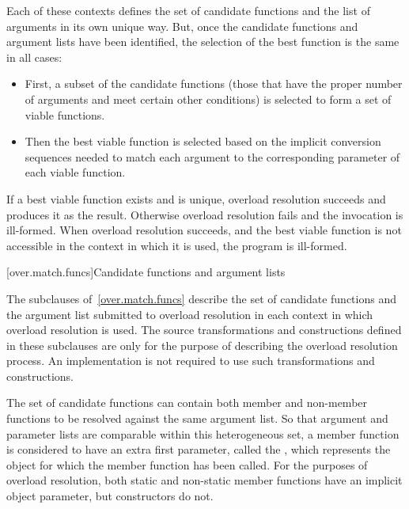 Each of these contexts defines the set of candidate functions and
the list of arguments in its own unique way.
But, once the
candidate functions and argument lists have been identified, the
selection of the best function is the same in all cases:

\begin{itemize}
\item
First, a subset of the candidate functions (those that have
the proper number of arguments and meet certain other
conditions) is selected to form a set of
%
viable functions.
\item
Then the best viable function is selected based on the
implicit conversion sequences needed to
match each argument to the corresponding parameter of each
viable function.
\end{itemize}

\pnum
If a best viable function exists and is unique, overload
resolution succeeds and produces it as the result.
Otherwise
overload resolution fails and the invocation is ill-formed.
When overload resolution succeeds,
and the best viable function is not accessible in the context
in which it is used,
the program is ill-formed.

[over.match.funcs]{Candidate functions and argument lists}%
%

\pnum
The subclauses of~\ref{over.match.funcs} describe
the set of candidate functions and the argument list submitted to
overload resolution in each context in which
overload resolution is used.
The source transformations and constructions defined
in these subclauses are only for the purpose of describing the
overload resolution process.
An implementation is not required
to use such transformations and constructions.

\pnum
{}%
%
The set of candidate functions can contain both member and non-member
functions to be resolved against the same argument list.
So that argument and parameter lists are comparable within this
heterogeneous set, a member function is considered to have an
extra first parameter, called the
,
which represents the object for which the member function has been
called.
For the purposes of overload resolution, both static and
non-static member functions have an implicit object parameter,
but constructors do not.

